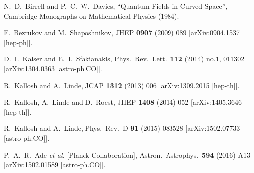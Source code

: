 \begin{thebibliography}{10}
  N.~D.~Birrell and P.~C.~W.~Davies, ``Quantum Fields in Curved Space'', Cambridge Monographs on Mathematical Physics (1984).

  F.~Bezrukov and M.~Shaposhnikov,
  JHEP {\bf 0907} (2009) 089
  [arXiv:0904.1537 [hep-ph]].


  D.~I.~Kaiser and E.~I.~Sfakianakis,
  Phys.\ Rev.\ Lett.\  {\bf 112} (2014) no.1,  011302
  [arXiv:1304.0363 [astro-ph.CO]].


  R.~Kallosh and A.~Linde,
  JCAP {\bf 1312} (2013) 006
  [arXiv:1309.2015 [hep-th]].


  R.~Kallosh, A.~Linde and D.~Roest,
  JHEP {\bf 1408} (2014) 052
  [arXiv:1405.3646 [hep-th]].


  R.~Kallosh and A.~Linde,
  Phys.\ Rev.\ D {\bf 91} (2015) 083528
  [arXiv:1502.07733 [astro-ph.CO]].


  P.~A.~R.~Ade {\it et al.} [Planck Collaboration],
  Astron.\ Astrophys.\  {\bf 594} (2016) A13
  [arXiv:1502.01589 [astro-ph.CO]].



\end{thebibliography}
